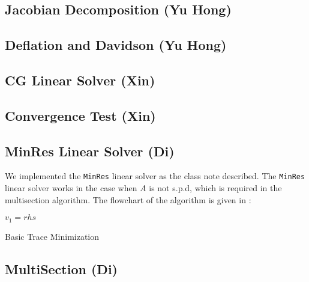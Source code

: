 \subsection{Jacobian Decomposition (Yu Hong)}

\subsection{Deflation and Davidson (Yu Hong)}

\subsection{CG Linear Solver (Xin)}

\subsection{Convergence Test (Xin)}

\subsection{MinRes Linear Solver (Di)}
We implemented the {\tt MinRes} linear solver as the class note described. The {\tt MinRes} linear solver works in the case when $A$ is not s.p.d, which is required in the multisection algorithm.  The flowchart of the algorithm is given in :
\begin{algorithm}[h]
	\SetArgSty{}
	{$v_1 = rhs$\;}
	\caption{Basic Trace Minimization}
\end{algorithm}

\subsection{MultiSection (Di)}
